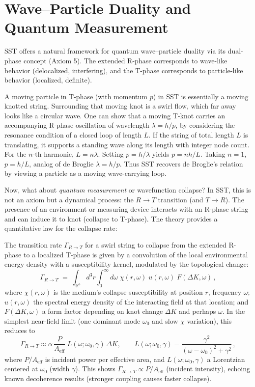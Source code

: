 \documentclass[reprint,aps,onecolumn,nofootinbib]{revtex4-2}
\begin{document}

	\section{Wave–Particle Duality and Quantum Measurement}
	SST offers a natural framework for quantum wave–particle duality via its dual-phase concept (Axiom 5). The extended R-phase corresponds to wave-like behavior (delocalized, interfering), and the T-phase corresponds to particle-like behavior (localized, definite).

	A moving particle in T-phase (with momentum $p$) in SST is essentially a moving knotted string. Surrounding that moving knot is a swirl flow, which far away looks like a circular wave. One can show that a moving T-knot carries an accompanying R-phase oscillation of wavelength $\lambda = h/p$, by considering the resonance condition of a closed loop of length $L$. If the string of total length $L$ is translating, it supports a standing wave along its length with integer node count. For the $n$-th harmonic, $L = n \lambda$. Setting $p = h/\lambda$ yields $p = n h/L$. Taking $n=1$, $p = h/L$, analog of de Broglie $\lambda = h/p$. Thus SST recovers de Broglie’s relation by viewing a particle as a moving wave-carrying loop.

	Now, what about \emph{quantum measurement} or wavefunction collapse? In SST, this is not an axiom but a dynamical process: the $R\to T$ transition (and $T\to R$). The presence of an environment or measuring device interacts with an R-phase string and can induce it to knot (collapse to T-phase). The theory provides a quantitative law for the collapse rate:

	\begin{tcolorbox}[title=Theorem 8.1: R$\to$T Transition Dynamics (Collapse Rate)]
		The transition rate $\Gamma_{R\to T}$ for a swirl string to collapse from the extended R-phase to a localized T-phase is given by a convolution of the local environmental energy density with a susceptibility kernel, modulated by the topological change:
		\[
			\Gamma_{R\to T} \;=\; \int_{\mathbb{R}^3}\! d^3r \int_0^{\infty}\! d\omega\;\chi(r,\omega)\;u(r,\omega)\;F(\Delta K,\omega)\,,
		\]
		where $\chi(r,\omega)$ is the medium’s collapse susceptibility at position $r$, frequency $\omega$; $u(r,\omega)$ the spectral energy density of the interacting field at that location; and $F(\Delta K,\omega)$ a form factor depending on knot change $\Delta K$ and perhaps $\omega$. In the simplest near-field limit (one dominant mode $\omega_0$ and slow $\chi$ variation), this reduces to
		\[
			\Gamma_{R\to T} \approx \alpha\, \frac{P}{A_{\text{eff}}}\; L(\omega; \omega_0,\gamma)\,\Delta K, \qquad
			L(\omega; \omega_0,\gamma) = \frac{\gamma^2}{(\omega-\omega_0)^2+\gamma^2}\,,
		\]
		where $P/A_{\text{eff}}$ is incident power per effective area, and $L(\omega; \omega_0,\gamma)$ a Lorentzian centered at $\omega_0$ (width $\gamma$). This shows $\Gamma_{R\to T} \propto P/A_{\text{eff}}$ (incident intensity), echoing known decoherence results (stronger coupling causes faster collapse).
	\end{tcolorbox}
\end{document}
